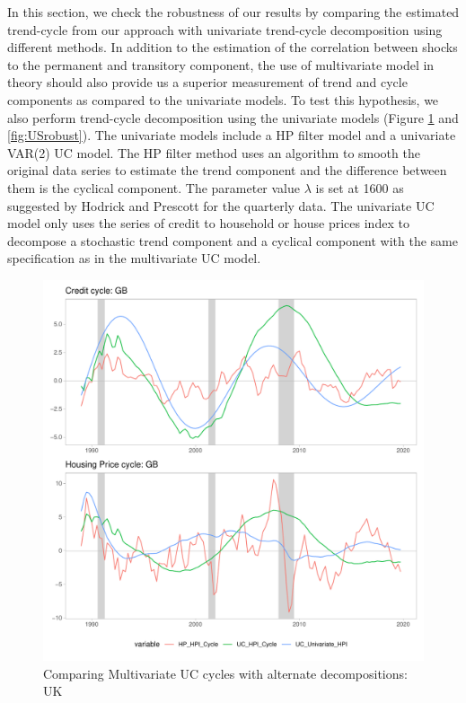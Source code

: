 \documentclass[
  12pt,
]{article}
\begin{document}
In this section, we check the robustness of our results by comparing the estimated trend-cycle from our approach with univariate trend-cycle decomposition using different methods. In addition to the estimation of the correlation between shocks to the permanent and transitory component, the use of multivariate model in theory should also provide us a superior measurement of trend and cycle components as compared to the univariate models. To test this hypothesis, we also perform trend-cycle decomposition using the univariate models (Figure \ref{fig:UKrobust} and \ref{fig:USrobust}). The univariate models include a HP filter model and a univariate VAR(2) UC model. The HP filter method uses an algorithm to smooth the original data series to estimate the trend component and the difference between them is the cyclical component. The parameter value \(\lambda\) is set at 1600 as suggested by Hodrick and Prescott for the quarterly data. The univariate UC model only uses the series of credit to household or house prices index to decompose a stochastic trend component and a cyclical component with the same specification as in the multivariate UC model.

\begin{figure}

{\centering \includegraphics[width=0.85\linewidth]{../../Regression/AR_2/Output/graphs/HP_Credit_2graphs_GB} 

}

\caption{Comparing Multivariate UC cycles with alternate decompositions: UK}\label{fig:UKrobust}
\end{figure}
\end{document}
